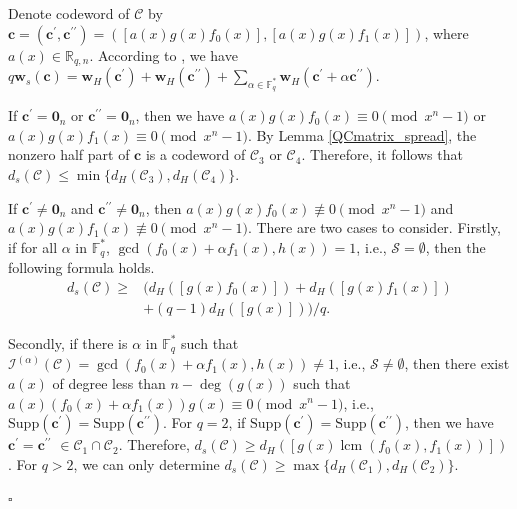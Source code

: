 \documentclass[journal]{IEEEtran}
\newenvironment{proof}{{\noindent\it Proof:} }{\hfill $\square$\par}
\begin{document}
\begin{proof}
 Denote codeword of $\mathscr{C}$ by $\mathbf{c}=(\mathbf{c}^{\prime},\mathbf{c}^{\prime\prime})=(\left[a(x)g(x)f_0(x)\right],\left[a(x)g(x)f_1(x)\right])$, where $a(x)\in \mathbb{R}_{q,n}$. 
According to \cite{ling2010generalization}, we have
$q\mathbf{w}_{s}(\mathbf{c})=\mathbf{w}_{H}(\mathbf{c}^{\prime})+\mathbf{w}_{H}(\mathbf{c}^{\prime\prime})+\sum\limits_{\alpha\in \mathbb{F}_q^*} \mathbf{w}_{H}(\mathbf{c}^{\prime}+\alpha \mathbf{c}^{\prime\prime})$.


If $\mathbf{c}^{\prime}=\mathbf{0}_n$ or $\mathbf{c}^{\prime\prime}=\mathbf{0}_n$, then we have $a(x)g(x)f_0(x)\equiv  0 \pmod{x^n-1}$ or $a(x)g(x)f_1(x) \equiv  0 \pmod{x^n-1}$.
By Lemma \ref{QCmatrix_spread}, the nonzero half part of $\mathbf{c}$ is a codeword of $\mathscr{C}_3$ or $\mathscr{C}_4$. 
Therefore, it follows that 
 $d_s(\mathscr{C})\le \min \{d_H(\mathscr{C}_3), d_H(\mathscr{C}_4)\}$. 


If $\mathbf{c}^{\prime}\ne \mathbf{0}_n$ and $\mathbf{c}^{\prime\prime}\ne \mathbf{0}_n$, then $a(x)g(x)f_0(x)\not\equiv 0 \pmod{x^n-1}$ and $a(x)g(x)f_1(x) \not\equiv 0 \pmod{x^n-1}$.
There are two cases to consider. 
Firstly, if for all $ \alpha$ in $\mathbb{F}_q^*$, $\gcd(f_0(x)+\alpha f_1(x),h(x))= 1$, i.e., $\mathcal{S} =\emptyset$,
then the following formula holds.
\begin{equation}\label{ESBound1}
	\begin{array}{rl}
		d_s(\mathscr{C})\ge&  (d_H(\left[ g(x)f_0(x)\right])+d_H(\left[g(x)f_1(x)\right])\\
		&+(q-1) d_H(\left[ g(x)\right] ))/q.
	\end{array}
\end{equation}


Secondly, if there is $\alpha$ in $\mathbb{F}_q^*$ such that $\mathcal{I}^{(\alpha)}(\mathscr{C})=\gcd(f_0(x)+\alpha f_1(x),h(x))\ne 1$, i.e., $\mathcal{S} \ne \emptyset$, then there exist  $a(x)$ of degree less than $n-\deg(g(x))$ such that $a(x)(f_0(x)+\alpha f_1(x)) g(x)\equiv 0 \pmod{x^n-1}$, i.e.,  $\mathrm{Supp}(\mathbf{c}^{\prime})=\mathrm{Supp}(\mathbf{c}^{\prime\prime})$. 
For $q=2$, if $\mathrm{Supp}(\mathbf{c}^{\prime})=\mathrm{Supp}(\mathbf{c}^{\prime\prime})$, then we have $\mathbf{c}^{\prime}=\mathbf{c}^{\prime\prime}$ $\in \mathscr{C}_1 \cap \mathscr{C}_2$. Therefore, 
$d_s(\mathscr{C}) \ge d_H( \left[ g(x) \operatorname{lcm}(f_0(x),f_1(x)) \right] )$.  
For $q> 2$, we can only determine $d_s(\mathscr{C})\ge \max\{d_H(\mathscr{C}_1),d_H(\mathscr{C}_2)\}$.



\end{proof}
\end{document}
